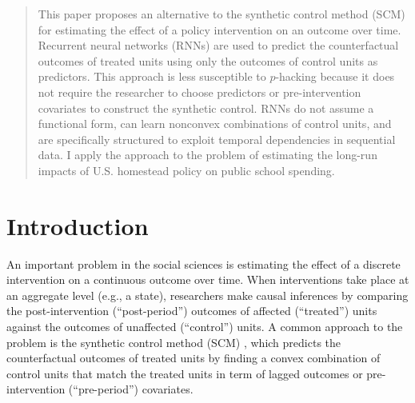 
 
 
\begin{singlespacing}
\maketitle  
\end{singlespacing}
\thispagestyle{empty}

\begin{abstract}  %
\noindent 
This paper proposes an alternative to the synthetic control method (SCM) for estimating the effect of a policy intervention on an outcome over time. Recurrent neural networks (RNNs) are used to predict the counterfactual outcomes of treated units using only the outcomes of control units as predictors. This approach is less susceptible to $p$-hacking because it does not require the researcher to choose predictors or pre-intervention covariates to construct the synthetic control. RNNs do not assume a functional form, can learn nonconvex combinations of control units, and are specifically structured to exploit temporal dependencies in sequential data. I apply the approach to the problem of estimating the long-run impacts of U.S. homestead policy on public school spending.  
\end{abstract}

\pagebreak
{}%

\section{Introduction} 

An important problem in the social sciences is estimating the effect of a discrete intervention on a continuous outcome over time. When interventions take place at an aggregate level (e.g., a state), researchers make causal inferences by comparing the post-intervention (``post-period'') outcomes of affected (``treated'') units against the outcomes of unaffected  (``control'') units. A common approach to the problem is the synthetic control method (SCM) \citep{abadie2010synthetic}, which predicts the counterfactual outcomes of treated units by finding a convex combination of control units that match the treated units in term of lagged outcomes or pre-intervention (``pre-period'') covariates. 

